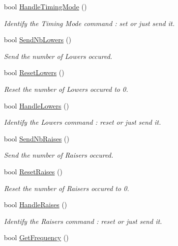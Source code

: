 \begin{DoxyCompactItemize}
bool \hyperlink{group___s_c_p__module_gacfa38bcf6c7c72d172f2991d3c0eb786}{Handle\+Timing\+Mode} ()
\begin{DoxyCompactList}\small\item\em Identify the Timing Mode command \+: set or just send it. \end{DoxyCompactList}\item 
bool \hyperlink{group___s_c_p__module_ga805f224220d816ef125133958c7c29f7}{Send\+Nb\+Lowers} ()
\begin{DoxyCompactList}\small\item\em Send the number of Lowers occured. \end{DoxyCompactList}\item 
bool \hyperlink{group___s_c_p__module_gabde4829070e5dc36f3f42a1efc913e3d}{Reset\+Lowers} ()
\begin{DoxyCompactList}\small\item\em Reset the number of Lowers occured to 0. \end{DoxyCompactList}\item 
bool \hyperlink{group___s_c_p__module_gadba1e1a64dcea76cfc2209babc9a3078}{Handle\+Lowers} ()
\begin{DoxyCompactList}\small\item\em Identify the Lowers command \+: reset or just send it. \end{DoxyCompactList}\item 
bool \hyperlink{group___s_c_p__module_ga6af72d5fe27167f3d906ae9368a515d0}{Send\+Nb\+Raises} ()
\begin{DoxyCompactList}\small\item\em Send the number of Raisers occured. \end{DoxyCompactList}\item 
bool \hyperlink{group___s_c_p__module_ga703956599f2e3aa20974182a82c14b0f}{Reset\+Raises} ()
\begin{DoxyCompactList}\small\item\em Reset the number of Raisers occured to 0. \end{DoxyCompactList}\item 
bool \hyperlink{group___s_c_p__module_gad048cc275f45cfec91a6ee1bdb8fa750}{Handle\+Raises} ()
\begin{DoxyCompactList}\small\item\em Identify the Raisers command \+: reset or just send it. \end{DoxyCompactList}\item 
bool \hyperlink{group___s_c_p__module_ga4880211d225c0d9616819ea355533e2e}{Get\+Frequency} ()

\end{DoxyCompactItemize}
